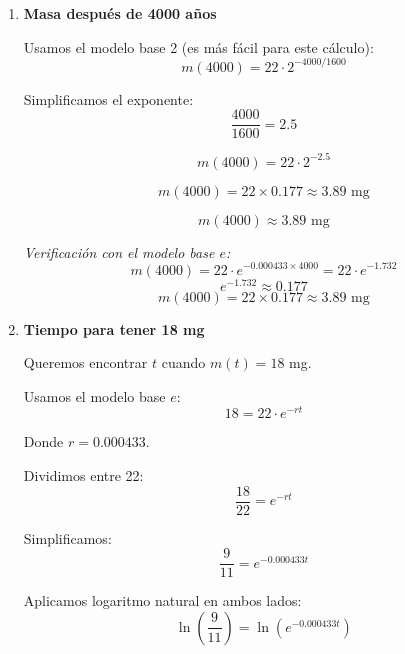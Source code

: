 \documentclass[12pt]{article}
\begin{document}
\begin{enumerate}[label=\alph*.-]
\begin{enumerate}[label=\roman*.]
        Para convertir del modelo base 2 al modelo base $e$, usamos la relación:
        \[2^{-t/h} = e^{-rt} \quad \text{donde } r = \frac{\ln 2}{h}\]
        
        Sabemos que $2 = e^{\ln 2}$, entonces:
        \[2^{-t/h} = \left(e^{\ln 2}\right)^{-t/h} = e^{(-t/h)\ln 2} = e^{-t(\ln 2/h)}\]
        
        Por lo tanto: $r = \dfrac{\ln 2}{h}$
        
        Calculamos $r$:
        \[r = \frac{\ln 2}{h} = \frac{0.6931}{1600} \approx 0.000433\]
        
        \[\boxed{m(t) = 22 \cdot e^{-0.000433t}} \quad \text{($t$ en años)}\]
        
        Ambos modelos son equivalentes, solo cambia la base del exponencial ($2$ vs $e$).
        
        \item \textbf{Masa después de 4000 años}
        
        Usamos el modelo base 2 (es más fácil para este cálculo):
        \[m(4000) = 22 \cdot 2^{-4000/1600}\]
        
        Simplificamos el exponente:
        \[\frac{4000}{1600} = 2.5\]
        
        \[m(4000) = 22 \cdot 2^{-2.5}\]
        
        \[m(4000) = 22 \times 0.177 \approx 3.89 \text{ mg}\]
        
        \[\boxed{m(4000) \approx 3.89 \text{ mg}}\]
        
        \textit{Verificación con el modelo base $e$:}
        \[m(4000) = 22 \cdot e^{-0.000433 \times 4000} = 22 \cdot e^{-1.732}\]
        \[e^{-1.732} \approx 0.177\]
        \[m(4000) = 22 \times 0.177 \approx 3.89 \text{ mg}\]
        
        \item \textbf{Tiempo para tener 18 mg}
        
        Queremos encontrar $t$ cuando $m(t) = 18$ mg.
        
        Usamos el modelo base $e$:
        \[18 = 22 \cdot e^{-rt}\]
        
        Donde $r = 0.000433$.
        
        Dividimos entre 22:
        \[\frac{18}{22} = e^{-rt}\]
        
        Simplificamos:
        \[\frac{9}{11} = e^{-0.000433t}\]
        
        Aplicamos logaritmo natural en ambos lados:
        \[\ln\left(\frac{9}{11}\right) = \ln\left(e^{-0.000433t}\right)\]
        

\end{enumerate}
\end{enumerate}
\end{document}
